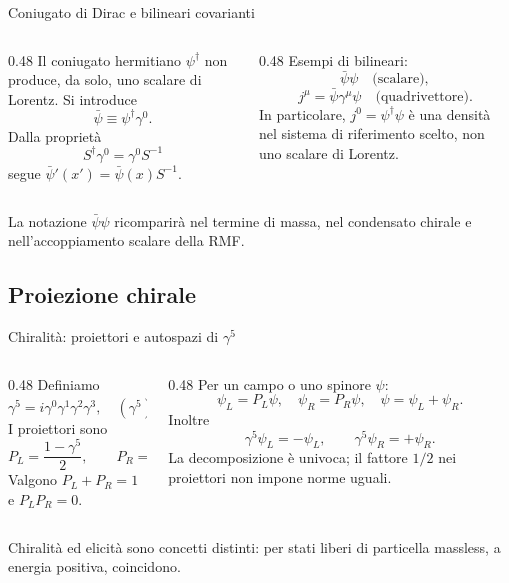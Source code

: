 \begin{frame}{Coniugato di Dirac e bilineari covarianti}
\small
\begin{columns}[T,onlytextwidth]
\begin{column}{0.48\textwidth}
Il coniugato hermitiano $\psi^\dagger$ non produce, da solo, uno scalare di Lorentz.
Si introduce
\[
 \bar\psi\equiv\psi^\dagger\gamma^0.
\]
Dalla proprietà
\[
 S^\dagger\gamma^0=\gamma^0S^{-1}
\]
segue $\bar\psi'(x')=\bar\psi(x)S^{-1}$.
\end{column}
\begin{column}{0.48\textwidth}
Esempi di bilineari:
\[
 \bar\psi\psi \quad\text{(scalare)},
\]
\[
 j^\mu=\bar\psi\gamma^\mu\psi
 \quad\text{(quadrivettore)}.
\]
In particolare, $j^0=\psi^\dagger\psi$ è una densità nel sistema di riferimento scelto, non uno scalare di Lorentz.
\end{column}
\end{columns}
\medskip
La notazione $\bar\psi\psi$ ricomparirà nel termine di massa, nel condensato chirale e nell'accoppiamento scalare della RMF.
\end{frame}

\subsection{Proiezione chirale}

\begin{frame}{Chiralità: proiettori e autospazi di $\gamma^5$}
\small
\begin{columns}[T,onlytextwidth]
\begin{column}{0.48\textwidth}
Definiamo
\[
 \gamma^5=i\gamma^0\gamma^1\gamma^2\gamma^3,
 \quad (\gamma^5)^2=\mathbf1_4.
\]
I proiettori sono
\[
 P_L=\frac{1-\gamma^5}{2},\qquad
 P_R=\frac{1+\gamma^5}{2}.
\]
Valgono $P_L+P_R=1$ e $P_LP_R=0$.
\end{column}
\begin{column}{0.48\textwidth}
Per un campo o uno spinore $\psi$:
\[
 \psi_L=P_L\psi,\quad \psi_R=P_R\psi,
 \quad \psi=\psi_L+\psi_R.
\]
Inoltre
\[
 \gamma^5\psi_L=-\psi_L,\qquad
 \gamma^5\psi_R=+\psi_R.
\]
La decomposizione è univoca; il fattore $1/2$ nei proiettori non impone norme uguali.
\end{column}
\end{columns}
\medskip
Chiralità ed elicità sono concetti distinti: per stati liberi di particella massless, a energia positiva, coincidono.
\end{frame}

